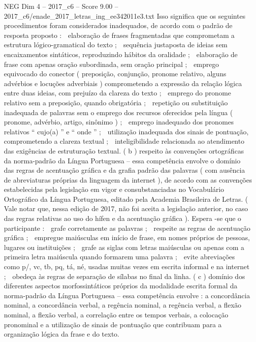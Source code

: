 \begin{textsample}{NEG Dim 4 – 2017\_c6 – Score 9.00 – 2017\_c6/enade\_2017\_letras\_ing\_ee342011e3.txt}
Isso significa que os seguintes procedimentos foram considerados inadequados, de acordo com o padrão de resposta proposto :  elaboração de frases fragmentadas que comprometam a estrutura lógico-gramatical do texto ;  sequência justaposta de ideias sem encaixamentos sintáticos, reproduzindo hábitos da oralidade ;  elaboração de frase com apenas oração subordinada, sem oração principal ;  emprego equivocado do conector ( preposição, conjunção, pronome relativo, alguns advérbios e locuções adverbiais ) comprometendo a expressão da relação lógica entre duas ideias, com prejuízo da clareza do texto ;  emprego do pronome relativo sem a preposição, quando obrigatória ;  repetição ou substituição inadequada de palavras sem o emprego dos recursos oferecidos pela língua ( pronome, advérbio, artigo, sinônimo ) ;  emprego inadequado dos pronomes relativos “ cujo(a) ” e “ onde ” ;  utilização inadequada dos sinais de pontuação, comprometendo a clareza textual ;  inteligibilidade relacionada ao atendimento das exigências de estruturação textual. ( b ) respeito às convenções ortográficas da norma-padrão da Língua Portuguesa – essa competência envolve o domínio das regras de acentuação gráfica e da grafia padrão das palavras ( com ausência de abreviaturas próprias da linguagem da internet ), de acordo com as convenções estabelecidas pela legislação em vigor e consubstanciadas no Vocabulário Ortográfico da Língua Portuguesa, editado pela Academia Brasileira de Letras. ( Vale notar que, nessa edição de 2017, não foi aceita a legislação anterior, no caso das regras relativas ao uso do hífen e da acentuação gráfica ).
Espera -se que o participante :  grafe corretamente as palavras ;  respeite as regras de acentuação gráfica ;  empregue maiúsculas em início de frase, em nomes próprios de pessoas, lugares ou instituições ;  grafe as siglas com letras maiúsculas ou apenas com a primeira letra maiúscula quando formarem uma palavra ;  evite abreviações como p/, vc, tb, pq, tá, né, usadas muitas vezes em escrita informal e na internet ;  obedeça às regras de separação de sílabas no final da linha. ( c ) domínio dos diferentes aspectos morfossintáticos próprios da modalidade escrita formal da norma-padrão da Língua Portuguesa – essa competência envolve : a concordância nominal, a concordância verbal, a regência nominal, a regência verbal, a flexão nominal, a flexão verbal, a correlação entre os tempos verbais, a colocação pronominal e a utilização de sinais de pontuação que contribuam para a organização lógica da frase e do texto.

\end{textsample}
